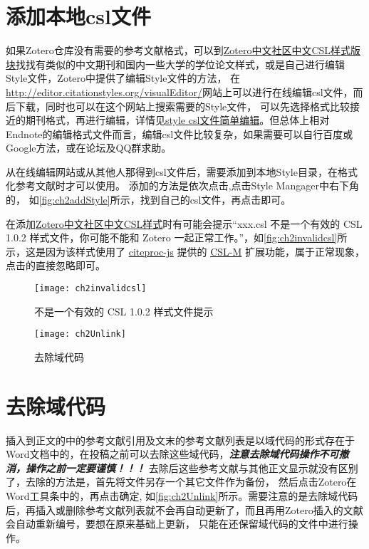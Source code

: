 \documentclass[theorem=false,mathfont=none,openany,sub3section]{easybook}
\begin{document}
\section{添加本地csl文件}\label{sec:addStyle}
如果Zotero仓库没有需要的参考文献格式，可以到\href{https://zotero-chinese.com/styles/}{Zotero中文社区中文CSL样式版块}找找有类似的中文期刊和国内一些大学的学位论文样式，或是自己进行编辑Style文件，Zotero中提供了编辑Style文件的方法，
在\url{http://editor.citationstyles.org/visualEditor/}网站上可以进行在线编辑csl文件，而后下载，同时也可以在这个网站上搜索需要的Style文件，
可以先选择格式比较接近的期刊格式，再进行编辑，详情见\href{https://zhuanlan.zhihu.com/p/336009544}{style csl文件简单编辑}。但总体上相对 Endnote的编辑格式文件而言，编辑csl文件比较复杂，如果需要可以自行百度或Google方法，或在论坛及QQ群求助。

从在线编辑网站或从其他人那得到csl文件后，需要添加到本地Style目录，在格式化参考文献时才可以使用。
添加的方法是依次点击,点击Style Mangager中右下角的\menu{+}，
如\autoref{fig:ch2addStyle}所示，找到自己的csl文件，再点击即可。

在添加\href{https://zotero-chinese.com/styles/}{Zotero中文社区中文CSL样式}时有可能会提示“xxx.csl 不是一个有效的 CSL 1.0.2 样式文件，你可能不能和 Zotero 一起正常工作。”，如\autoref{fig:ch2invalidcsl}所示，这是因为该样式使用了 \href{https://github.com/Juris-M/citeproc-js}{citeproc-js} 提供的 \href{https://citeproc-js.readthedocs.io/en/latest/csl-m/index.html}{CSL-M} 扩展功能，属于正常现象，点击的直接忽略即可。
\begin{figure}[htbp]
	\centering
	\texttt{[image: ch2invalidcsl]}
	\caption{不是一个有效的 CSL 1.0.2 样式文件提示}
	\label{fig:ch2invalidcsl}
\end{figure}


\begin{figure}[htbp]
	\centering
	\texttt{[image: ch2Unlink]}
	\caption{去除域代码}
	\label{fig:ch2Unlink}
\end{figure}

\section{去除域代码}\label{sec:Remove_field}
插入到正文的中的参考文献引用及文末的参考文献列表是以域代码的形式存在于Word文档中的，在投稿之前可以去除这些域代码，\textbf{\emph{注意去除域代码操作不可撤消，操作之前一定要谨慎！！！}}
去除后这些参考文献与其他正文显示就没有区别了，去除的方法是，首先将文件另存一个其它文件作为备份，
然后点击Zotero在Word工具条中的，再点击确定,
如\autoref{fig:ch2Unlink}所示。需要注意的是去除域代码后，再插入或删除参考文献列表就不会再自动更新了，而且再用Zotero插入的文献会自动重新编号，要想在原来基础上更新，
只能在还保留域代码的文件中进行操作。
\end{document}
